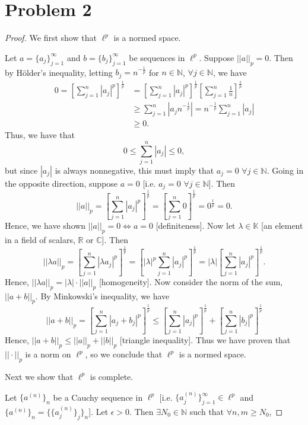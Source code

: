\documentclass{article}
\begin{document}
\section*{Problem 2}
\begin{proof}
	We first show that $\ell^p$ is a normed space. 
	
	Let $a = \{a_j\}_{j=1}^{\infty}$ and $b = \{b_j\}_{j=1}^{\infty}$ be sequences in $\ell^p$. Suppose $||a||_p=0$. Then by Hölder's inequality, letting $b_j=n^{-\frac{1}{p}}$ for $n\in \mathbb{N}$, $\forall j\in\mathbb{N}$, we have
	\begin{align}
		0=\left[\sum_{j=1}^n|a_j|^p\right]^\frac{1}{p} &= \left[\sum_{j=1}^{n}|a_j|^p\right]^\frac{1}{p} \left[\sum_{j=1}^n \frac{1}{n}\right]^\frac{1}{p}\\
		&\geq \sum_{j=1}^n |a_j n^{-\frac{1}{p}}| = n^{-\frac{1}{p}}\sum_{j=1}^n |a_j| \\
		&\geq 0.
	\end{align}
	Thus, we have that
	\begin{equation}
		0\leq \sum_{j=1}^n |a_j| \leq 0,
	\end{equation}
	but since $|a_j|$ is always nonnegative, this must imply that $a_j=0$ $\forall j\in \mathbb{N}$. Going in the opposite direction, suppose $a=0$ [i.e. $a_j=0$ $\forall j\in \mathbb{N}$]. Then
	\begin{equation}
		||a||_p=\left[\sum_{j=1}^n |a_j|^p\right]^\frac{1}{p} = \left[\sum_{j=1}^n 0\right]^\frac{1}{p}=0^\frac{1}{p}=0. 
	\end{equation}
	Hence, we have shown $||a||_p = 0 \iff a = 0$ [definiteness]. Now let $\lambda\in\mathbb{K}$ [an element in a field of scalars, $\mathbb{R}$ or $\mathbb{C}$]. Then
	\begin{equation}
		||\lambda a||_p = \left[\sum_{j=1}^n |\lambda a_j|^p\right]^\frac{1}{p}=\left[|\lambda|^p \sum_{j=1}^n |a_j|^p\right]^\frac{1}{p} = |\lambda|\left[\sum_{j=1}^n |a_j|^p\right]^\frac{1}{p}.
	\end{equation}
	Hence, $||\lambda a||_p = |\lambda|\cdot||a||_p$ [homogeneity]. Now consider the norm of the sum, $||a+b||_p$. By Minkowski's inequality, we have
	\begin{equation}
		||a+b||_p = \left[\sum_{j=1}^n |a_j +b_j|^p\right]^\frac{1}{p}\leq \left[\sum_{j=1}^n |a_j|^p\right]^\frac{1}{p} + \left[\sum_{j=1}^n |b_j|^p\right]^\frac{1}{p}
	\end{equation}
	Hence, $||a+b||_p \leq ||a||_p + ||b||_p$ [triangle inequality]. Thus we have proven that $||\cdot||_p$ is a norm on $\ell^p$, so we conclude that $\ell^p$ is a normed space. 
	
	Next we show that $\ell^p$ is complete. 
	
	Let $\{a^{(n)}\}_n$ be a Cauchy sequence in $\ell^p$ [i.e. $\{a_j^{(n)}\}_{j=1}^{\infty}\in\ell^p$ and $\{a^{(n)}\}_n=\{\{a_j^{(n)}\}_{j}\}_{n}$]. Let $\epsilon>0$. Then $\exists N_0\in\mathbb{N}$ such that $\forall n,m\geq N_0$, 
\end{proof}
\end{document}
